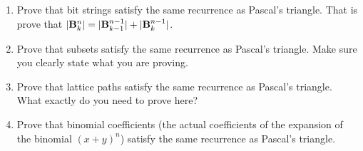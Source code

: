 \documentclass{book}
\begin{document}
\setcounter{project}{71}
\addtocounter{project}{-1}
\begin{activity}[]\label{activity-64}
\leavevmode%
\begin{enumerate}[font=\bfseries,label=(\alph*),ref=\alph*]
\item\label{task-100} \hypertarget{p-554}{}%
Prove that bit strings satisfy the same recurrence as Pascal's triangle.  That is prove that \(|\mathbf{B}^n_k| = |\mathbf{B}^{n-1}_{k-1}| + |\mathbf{B}^{n-1}_k|\).%
\item\label{task-101} \hypertarget{p-555}{}%
Prove that subsets satisfy the same recurrence as Pascal's triangle. Make sure you clearly state what you are proving.%
\item\label{task-102} \hypertarget{p-556}{}%
Prove that lattice paths satisfy the same recurrence as Pascal's triangle.  What exactly do you need to prove here?%
\item\label{task-103} \hypertarget{p-557}{}%
Prove that binomial coefficients (the actual coefficients of the expansion of the binomial \((x+y)^n\)) satisfy the same recurrence as Pascal's triangle.%
\end{enumerate}
\end{activity}

\clearpage
\end{document}
